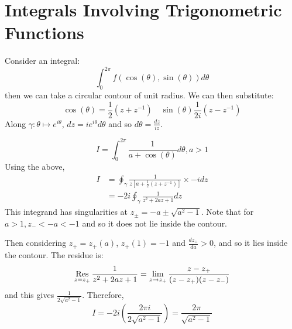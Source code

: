 \documentclass[../Main.tex]{subfiles}
\begin{document}
\section{Integrals Involving Trigonometric Functions}
Consider an integral:
\begin{equation*}
    \int_{0}^{2\pi} f(\cos(\theta), \sin(\theta)) d\theta
\end{equation*}
then we can take a circular contour of unit radius. We can then substitute:
\begin{equation*}
    \cos(\theta) = \frac12 \left(z + z^{-1}\right) \quad \sin(\theta) \frac{1}{2i} (z - z^{-1})
\end{equation*}
Along $\gamma : \theta \mapsto e^{i\theta}$, $dz = ie^{i\theta} d\theta$ and so $d\theta = \frac{dz}{iz}$.
\begin{example}
    \begin{equation*}
        I = \int_{0}^{2\pi} \frac{1}{a + \cos(\theta)} d\theta, a > 1
    \end{equation*}
    Using the above,
    \begin{align*}
        I &= \oint_{\gamma} \frac{1}{z \left[a + \frac12 (z + z^{-1})\right]} \times -i dz \\
        &= -2i \oint_{\gamma} \frac{1}{z^2 + 2az + 1} dz
    \end{align*}
    This integrand has singularities at $z_{\pm} = -a \pm \sqrt{a^2 - 1}$. Note that for $a > 1, z_- < -a < -1$ and so it does not lie inside the contour.

    Then considering $z_+ = z_+(a)$, $z_+(1) = -1$ and $\frac{dz_+}{da} > 0$, and so it lies inside the contour. The residue is:
    \begin{equation*}
        \operatorname*{Res}_{z = z_+} \frac{1}{z^2 + 2az + 1} = \lim_{z \to z_+} \frac{z - z_+}{(z - z_+)(z - z_-)}
    \end{equation*}
    and this gives $\frac{1}{2\sqrt{a^2 - 1}}$. Therefore,
    \begin{equation*}
        I = -2i \left(\frac{2\pi i}{2\sqrt{a^2 - 1}}\right) = \frac{2\pi}{\sqrt{a^2 - 1}}
    \end{equation*}
\end{example}
\end{document}
